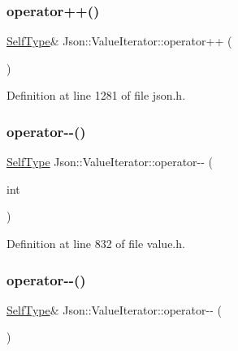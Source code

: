 \subsubsection{\texorpdfstring{operator++()}{operator++()}\hspace{0.1cm}{\footnotesize\ttfamily [4/4]}}
{\footnotesize\ttfamily \hyperlink{class_json_1_1_value_iterator_base_a9d2a940d03ea06d20d972f41a89149ee}{Self\+Type}\& Json\+::\+Value\+Iterator\+::operator++ (\begin{DoxyParamCaption}{ }\end{DoxyParamCaption})\hspace{0.3cm}{\ttfamily [inline]}}



Definition at line 1281 of file json.\+h.

\hypertarget{class_json_1_1_value_iterator_a06d6a29d96caf6af324a53973159e12b}{}\label{class_json_1_1_value_iterator_a06d6a29d96caf6af324a53973159e12b} 
\subsubsection{\texorpdfstring{operator-\/-\/()}{operator--()}\hspace{0.1cm}{\footnotesize\ttfamily [1/4]}}
{\footnotesize\ttfamily \hyperlink{class_json_1_1_value_iterator_base_a9d2a940d03ea06d20d972f41a89149ee}{Self\+Type} Json\+::\+Value\+Iterator\+::operator-\/-\/ (\begin{DoxyParamCaption}\item[{int}]{ }\end{DoxyParamCaption})\hspace{0.3cm}{\ttfamily [inline]}}



Definition at line 832 of file value.\+h.

\hypertarget{class_json_1_1_value_iterator_a811302a868518a0995a9def955df5720}{}\label{class_json_1_1_value_iterator_a811302a868518a0995a9def955df5720} 
\subsubsection{\texorpdfstring{operator-\/-\/()}{operator--()}\hspace{0.1cm}{\footnotesize\ttfamily [2/4]}}
{\footnotesize\ttfamily \hyperlink{class_json_1_1_value_iterator_base_a9d2a940d03ea06d20d972f41a89149ee}{Self\+Type}\& Json\+::\+Value\+Iterator\+::operator-\/-\/ (\begin{DoxyParamCaption}{ }\end{DoxyParamCaption})\hspace{0.3cm}{\ttfamily [inline]}}



